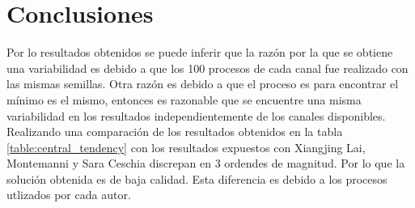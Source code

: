 \section{Conclusiones}

Por lo resultados obtenidos se puede inferir que la razón por la que se obtiene una variabilidad es debido a que los 100 procesos de cada canal fue realizado con las mismas semillas. Otra razón es debido a que el proceso es para encontrar el mínimo es el mismo, entonces es razonable que se encuentre una misma variabilidad en los resultados independientemente de los canales disponibles. Realizando una comparación de los resultados obtenidos en la tabla \ref{table:central_tendency} con los resultados expuestos con Xiangjing Lai\cite{Lai_2015}, Montemanni\cite{Montemanni_2010} y Sara Ceschia\cite{Ceschia_2022} discrepan en 3 ordendes de magnitud. Por lo que la solución obtenida es de baja calidad. Esta diferencia es debido a los procesos utlizados por cada autor.